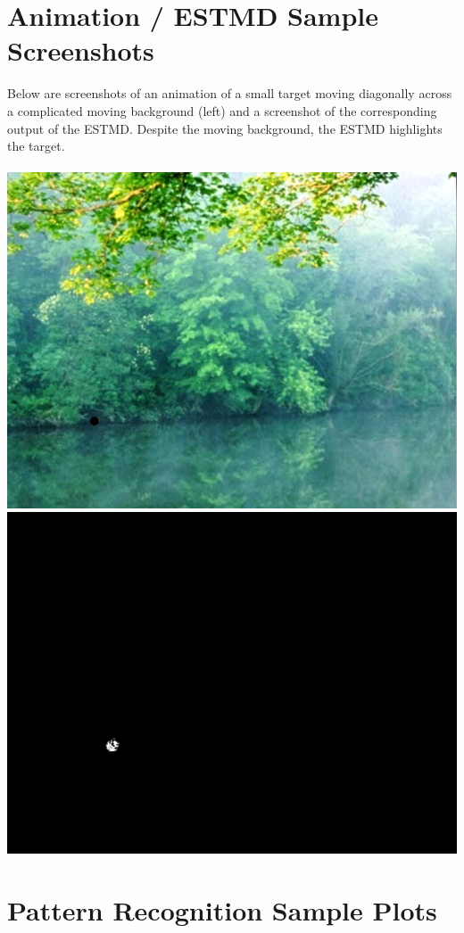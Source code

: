\documentclass[a4paper,11pt]{article}
\begin{document}
\newpage
\begin{appendices}
\section{Animation / ESTMD Sample Screenshots}
Below are screenshots of an animation of a small target moving diagonally across a complicated moving background (left) and a screenshot of the corresponding output of the ESTMD. Despite the moving background, the ESTMD highlights the target. \\ \\
\includegraphics[scale = 0.4]{input}
\includegraphics[scale = 0.5]{processed}

\section{Pattern Recognition Sample Plots}

\end{appendices}
\end{document}
